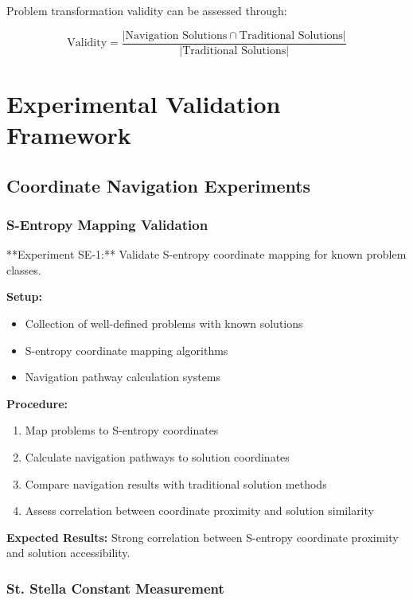 \documentclass[12pt,a4paper]{article}
\begin{document}
Problem transformation validity can be assessed through:

\begin{equation}
\text{Validity} = \frac{|\text{Navigation Solutions} \cap \text{Traditional Solutions}|}{|\text{Traditional Solutions}|}
\label{eq:transformation_validity}
\end{equation}

\section{Experimental Validation Framework}

\subsection{Coordinate Navigation Experiments}

\subsubsection{S-Entropy Mapping Validation}

**Experiment SE-1:** Validate S-entropy coordinate mapping for known problem classes.

\textbf{Setup:}
\begin{itemize}
\item Collection of well-defined problems with known solutions
\item S-entropy coordinate mapping algorithms
\item Navigation pathway calculation systems
\end{itemize}

\textbf{Procedure:}
\begin{enumerate}
\item Map problems to S-entropy coordinates
\item Calculate navigation pathways to solution coordinates
\item Compare navigation results with traditional solution methods
\item Assess correlation between coordinate proximity and solution similarity
\end{enumerate}

\textbf{Expected Results:} Strong correlation between S-entropy coordinate proximity and solution accessibility.

\subsubsection{St. Stella Constant Measurement}
\end{document}
